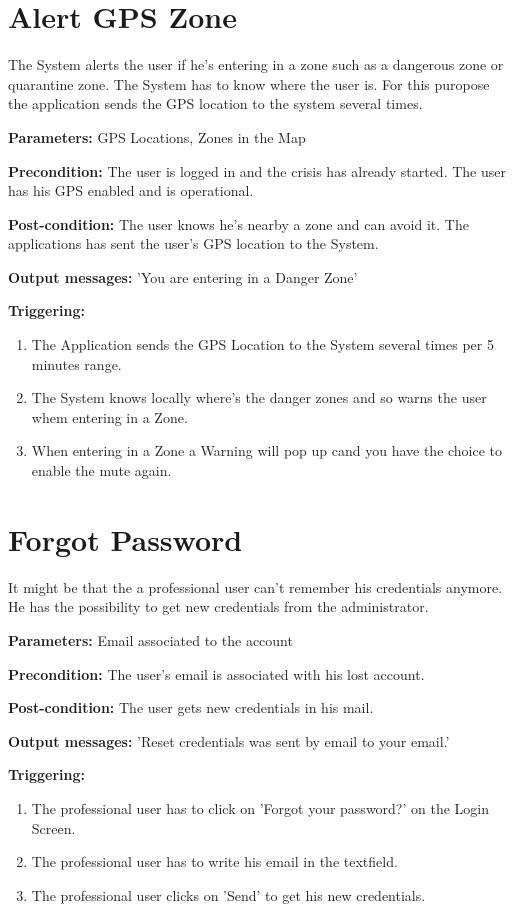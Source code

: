 \section{Alert GPS Zone}
\label{operation:AlertGPSZone}
The System alerts the user if he's entering in a zone such as a dangerous zone
or quarantine zone. The System has to know where the user is. For this
puropose the application sends the GPS location to the system several times.\\
\begin{description}
\item \textbf{Parameters:} GPS Locations, Zones in the Map 
\item \textbf{Precondition:} The user is logged in and the
crisis has already started. The user has his GPS enabled and is operational.
\item \textbf{Post-condition:} The user knows he's nearby a zone and can avoid
it. The applications has sent the user's GPS location to the System.
\item \textbf{Output messages:} 'You are entering in a Danger Zone'
\item \textbf{Triggering:}
\begin{enumerate}
\item The Application sends the GPS Location to the System several times per 5
minutes range.
\item The System knows locally where's the danger zones and so warns the user
whem entering in a Zone.
\item When entering in a Zone a Warning will pop up cand you have the choice to
enable the mute again.
\end{enumerate}
\end{description}   

\section{Forgot Password}
\label{operation:ForgotPassword}
It might be that the a professional user can't remember his credentials
anymore. He has the possibility to get new credentials from the administrator.\\
\begin{description}
\item \textbf{Parameters:}  Email associated to the account
\item \textbf{Precondition:} The user's email is associated with his lost
account.
\item \textbf{Post-condition:} The user gets new credentials in his mail.
\item \textbf{Output messages:} 'Reset credentials was sent by email to your
email.'
\item \textbf{Triggering:}
\begin{enumerate}
\item The professional user has to click on 'Forgot your password?' on the Login
Screen.
\item The professional user has to write his email in the textfield.
\item The professional user clicks on 'Send' to get his new credentials.
\end{enumerate}
\end{description}   

